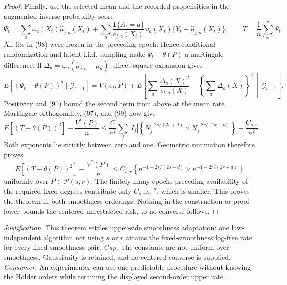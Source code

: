 \documentclass{article}
\begin{document}
\begin{proof}
Finally, use the selected mean and the recorded propensities in the augmented inverse-probability score
\[
\Psi_t=
\sum_a\omega_a(X_t)\widehat\mu_{j,a}(X_t)
+\sum_a\frac{\mathbf1\{A_t=a\}}{e_{t,a}(X_t)}
\omega_a(X_t)\{Y_t-\widehat\mu_{j,a}(X_t)\},
\qquad
T=\frac1n\sum_{t=1}^n\Psi_t.
\tag{98}
\]
All fits in (98) were frozen in the preceding epoch. Hence conditional randomization and latent i.i.d. sampling make \(\Psi_t-\theta(P)\) a martingale difference. If \(\Delta_a=\omega_a(\widehat\mu_{j,a}-\mu_a)\), direct square expansion gives
\[
E[(\Psi_t-\theta(P))^2\mid\mathcal G_{t-1}]
=V(e_t;P)+E\!\left[
\sum_a\frac{\Delta_a(X)^2}{e_{t,a}(X)}
-\left\{\sum_a\Delta_a(X)\right\}^2
\,\middle|\,\mathcal G_{t-1}\right].
\tag{99}
\]
Positivity and (91) bound the second term from above at the mean rate. Martingale orthogonality, (97), and (99) now give
\[
E[(T-\theta(P))^2]-\frac{V^*(P)}n
\leq\frac{C}{n^2}\sum_j|I_j|
\left\{N_j^{-2s/(2s+d)}\vee N_j^{-2r/(2r+d)}\right\}
+\frac{C_{s,r}}{n^2}.
\]
Both exponents lie strictly between zero and one. Geometric summation therefore proves
\[
E[(T-\theta(P))^2]-\frac{V^*(P)}n
\leq C_{s,r}\left\{
n^{-1-2s/(2s+d)}\vee n^{-1-2r/(2r+d)}
\right\}
\]
uniformly over \(P\in\mathcal P(s,r)\). The finitely many epochs preceding availability of the required fixed degrees contribute only \(C_{s,r}n^{-2}\), which is smaller. This proves the theorem in both smoothness orderings. Nothing in the construction or proof lower-bounds the centered unrestricted risk, so no converse follows.
\end{proof}
\par\smallskip\noindent \textit{Justification.} This theorem settles upper-side smoothness adaptation: one law-independent algorithm not using \(s\) or \(r\) attains the fixed-smoothness log-free rate for every fixed smoothness pair. \textit{Gap.} The constants are not uniform over smoothness, Gaussianity is retained, and no centered converse is supplied. \textit{Consumer.} An experimenter can use one predictable procedure without knowing the Hölder orders while retaining the displayed second-order upper rate.
\end{document}
